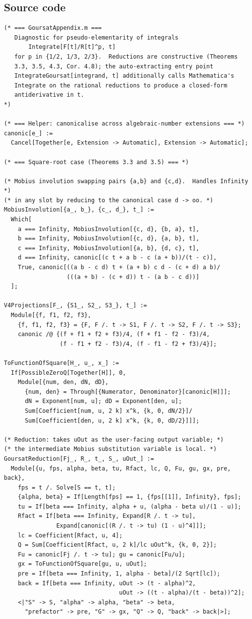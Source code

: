 \documentclass[11pt,a4paper]{article}
\theoremstyle{plain}
\theoremstyle{definition}
\theoremstyle{remark}
\begin{document}
\subsection*{Source code}

\begin{lstlisting}
(* === GoursatAppendix.m ===
   Diagnostic for pseudo-elementarity of integrals
       Integrate[F[t]/R[t]^p, t]
   for p in {1/2, 1/3, 2/3}.  Reductions are constructive (Theorems
   3.3, 3.5, 4.3, Cor. 4.8); the auto-extracting entry point
   IntegrateGoursat[integrand, t] additionally calls Mathematica's
   Integrate on the rational reductions to produce a closed-form
   antiderivative in t.
*)

(* === Helper: canonicalise across algebraic-number extensions === *)
canonic[e_] :=
  Cancel[Together[e, Extension -> Automatic], Extension -> Automatic];

(* === Square-root case (Theorems 3.3 and 3.5) === *)

(* Mobius involution swapping pairs {a,b} and {c,d}.  Handles Infinity *)
(* in any slot by reducing to the canonical case d -> oo. *)
MobiusInvolution[{a_, b_}, {c_, d_}, t_] :=
  Which[
    a === Infinity, MobiusInvolution[{c, d}, {b, a}, t],
    b === Infinity, MobiusInvolution[{c, d}, {a, b}, t],
    c === Infinity, MobiusInvolution[{a, b}, {d, c}, t],
    d === Infinity, canonic[(c t + a b - c (a + b))/(t - c)],
    True, canonic[((a b - c d) t + (a + b) c d - (c + d) a b)/
                  (((a + b) - (c + d)) t - (a b - c d))]
  ];

V4Projections[F_, {S1_, S2_, S3_}, t_] :=
  Module[{f, f1, f2, f3},
    {f, f1, f2, f3} = {F, F /. t -> S1, F /. t -> S2, F /. t -> S3};
    canonic /@ {(f + f1 + f2 + f3)/4, (f + f1 - f2 - f3)/4,
                (f - f1 + f2 - f3)/4, (f - f1 - f2 + f3)/4}];

ToFunctionOfSquare[H_, u_, x_] :=
  If[PossibleZeroQ[Together[H]], 0,
    Module[{num, den, dN, dD},
      {num, den} = Through[{Numerator, Denominator}[canonic[H]]];
      dN = Exponent[num, u]; dD = Exponent[den, u];
      Sum[Coefficient[num, u, 2 k] x^k, {k, 0, dN/2}]/
      Sum[Coefficient[den, u, 2 k] x^k, {k, 0, dD/2}]]];

(* Reduction: takes uOut as the user-facing output variable; *)
(* the intermediate Mobius substitution variable is local. *)
GoursatReduction[Fj_, R_, t_, S_, uOut_] :=
  Module[{u, fps, alpha, beta, tu, Rfact, lc, Q, Fu, gu, gx, pre, back},
    fps = t /. Solve[S == t, t];
    {alpha, beta} = If[Length[fps] == 1, {fps[[1]], Infinity}, fps];
    tu = If[beta === Infinity, alpha + u, (alpha - beta u)/(1 - u)];
    Rfact = If[beta === Infinity, Expand[R /. t -> tu],
               Expand[canonic[(R /. t -> tu) (1 - u)^4]]];
    lc = Coefficient[Rfact, u, 4];
    Q = Sum[Coefficient[Rfact, u, 2 k]/lc uOut^k, {k, 0, 2}];
    Fu = canonic[Fj /. t -> tu]; gu = canonic[Fu/u];
    gx = ToFunctionOfSquare[gu, u, uOut];
    pre = If[beta === Infinity, 1, alpha - beta]/(2 Sqrt[lc]);
    back = If[beta === Infinity, uOut -> (t - alpha)^2,
                                 uOut -> ((t - alpha)/(t - beta))^2];
    <|"S" -> S, "alpha" -> alpha, "beta" -> beta,
      "prefactor" -> pre, "G" -> gx, "Q" -> Q, "back" -> back|>];


\end{lstlisting}
\end{document}
